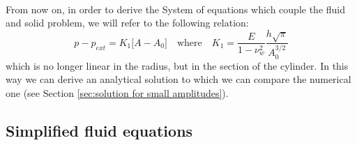 \documentclass[12pt,a4paper]{article}
\numberwithin{equation}{section}
\begin{document}
\\
From now on, in order to derive the System of equations which couple the fluid and solid problem, we will refer to the following relation:
\begin{equation}\label{eq:Hoop law}
p-p_{ext} = K_1 \big[A-A_0\big] \quad \textrm{where} \quad K_1 = \frac{E}{1-\nu_w^2}\frac{h\sqrt{\pi}}{A_0^{3/2}}
\end{equation}
which is no longer linear in the radius, but in the section of the cylinder. In this way we can derive an analytical solution to which we can compare the numerical one (see Section \ref{sec:solution for small amplitudes}). 
\\
\subsection{Simplified fluid equations}
\end{document}
